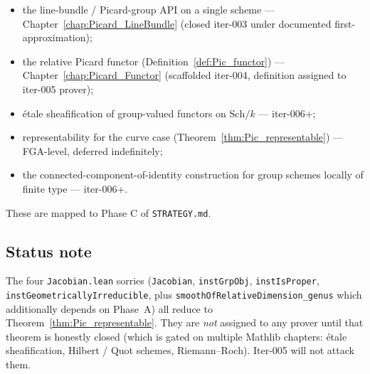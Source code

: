 \begin{itemize}
  \item the line-bundle / Picard-group API on a single scheme — Chapter~\ref{chap:Picard_LineBundle} (closed iter-003 under documented first-approximation);
  \item the relative Picard functor (Definition~\ref{def:Pic_functor}) — Chapter~\ref{chap:Picard_Functor} (scaffolded iter-004, definition assigned to iter-005 prover);
  \item étale sheafification of group-valued functors on $\mathrm{Sch}/k$ — iter-006+;
  \item representability for the curve case (Theorem~\ref{thm:Pic_representable}) — FGA-level, deferred indefinitely;
  \item the connected-component-of-identity construction for group schemes locally of finite type — iter-006+.
\end{itemize}

These are mapped to Phase C of \texttt{STRATEGY.md}.

\subsection{Status note}

The four \lstinline{Jacobian.lean} sorries (\lstinline{Jacobian}, \lstinline{instGrpObj}, \lstinline{instIsProper}, \lstinline{instGeometricallyIrreducible}, plus \lstinline{smoothOfRelativeDimension_genus} which additionally depends on Phase~A) all reduce to Theorem~\ref{thm:Pic_representable}. They are \emph{not} assigned to any prover until that theorem is honestly closed (which is gated on multiple Mathlib chapters: étale sheafification, Hilbert / Quot schemes, Riemann--Roch). Iter-005 will not attack them.
